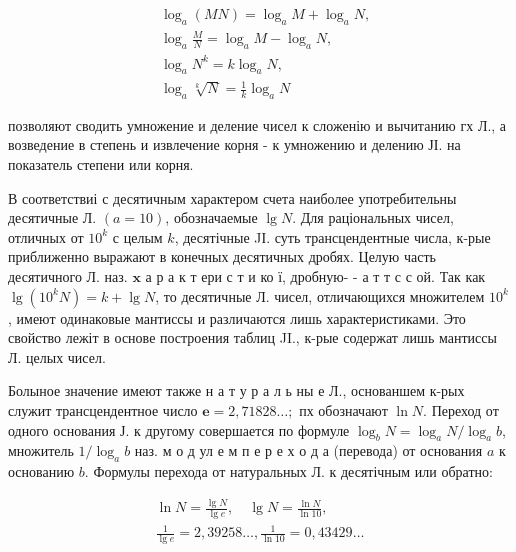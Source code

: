 \documentclass[10pt]{article}
\begin{document}
\[

\begin{aligned}

& \log _{a}(M N)=\log _{a} M+\log _{a} N, \\

& \log _{a} \frac{M}{N}=\log _{a} M-\log _{a} N, \\

& \log _{a} N^{k}=k \log _{a} N, \\

& \log _{a} \sqrt[k]{N}=\frac{1}{k} \log _{a} N

\end{aligned}

\]



позволяют сводить умножение и деление чисел к сложенію и вычитанию гх Л., а возведение в степень и извлечение корня - к умножению и делению ЈІ. на показатель степени или корня.



В соответствиі с десятичным характером счета наиболее употребительны десятичные Л. $(a=10)$, обозначаемые $\lg N$. Для раціональных чисел, отличных от $10^{k}$ с целым $k$, десятічные JІ. суть трансцендентные числа, к-рые приближенно выражают в конечных десятичных дробях. Целую часть десятичного Л. наз. $\mathbf{x}$ а р а к т ери с т и ко ї, дробную- - а т т с с ой. Так как $\lg \left(10^{k} N\right)=k+\lg N$, то десятичные Л. чисел, отличающихся множителем $10^{k}$, имеют одинаковые мантиссы и различаются лишь характеристиками. Это свойство лежіт в основе построения таблиц JI., к-рые содержат лишь мантиссы Л. целых чисел.



Болыное значение имеют также н а т у р а л ь ны е Л., основаншем к-рых служит трансцендентное число $\boldsymbol{e}=2,71828 \ldots ;$ пх обозначают $\ln N$. Переход от одного основания Ј. к другому совершается по формуле $\log _{b} N=\log _{a} N / \log _{a} b$, множитель $1 / \log _{a} b$ наз. м о д ул е м п е р е х о д а (перевода) от основания $a$ к основанию $b$. Формулы перехода от натуральных Л. к десятічным или обратно:



\[

\begin{gathered}

\ln N=\frac{\lg N}{\lg e}, \quad \lg N=\frac{\ln N}{\ln 10}, \\

\frac{1}{\lg e}=2,39258 \ldots, \frac{1}{\ln 10}=0,43429 \ldots

\end{gathered}

\]
\end{document}
